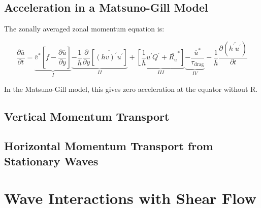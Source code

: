 \subsection*{Acceleration in a Matsuno-Gill Model}

The zonally averaged zonal momentum equation is:

\begin{equation}
  \frac { \partial \overline { u } } { \partial t } = \underbrace { \overline { v } ^ { * } \left[ f - \frac { \partial \overline { u } } { \partial y } \right] } _ { I } \underbrace { - \frac { 1 } { \overline { h } } \frac { \partial } { \partial y } \left[ \overline { ( h v ) ^ { \prime } u ^ { \prime } } \right] } _ { I I } + \underbrace { \left[ \frac { 1 } { \overline { h } } \overline { u ^ { \prime } Q ^ { \prime } } + \overline { R _ { u } } ^ { * } \right] } _ { I I I } \underbrace { - \frac { \overline { u } ^ { * } } { \tau _ { \mathrm { drag } } } } _ { I V } - \frac { 1 } { \overline { h } } \frac { \partial \left( \overline { h ^ { \prime } u ^ { \prime } } \right) } { \partial t }
\end{equation}

In the Matsuno-Gill model, this gives zero acceleration at the equator without R.

\subsection*{Vertical Momentum Transport}

\subsection*{Horizontal Momentum Transport from Stationary Waves}






\section{Wave Interactions with Shear Flow}


